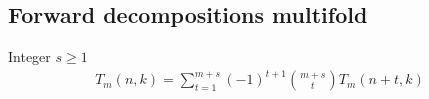\subsection{Forward decompositions multifold}\label{subsec:forward-decompositions-multifold}
\begin{proposition}
    Integer $s \geq 1$
    \label{prop:Tm-recurrence-forward-multifold}
    \begin{align*}
        T_{m} (n,k) = \sum_{t=1}^{m+s} (-1)^{t+1} \binom{m+s}{t} T_{m} (n+t, k)
    \end{align*}
\end{proposition}
